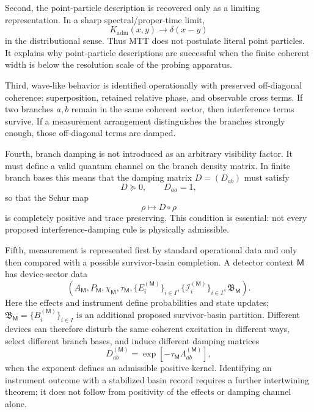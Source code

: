 \documentclass[11pt]{article}
\newcommand{\Kadm}{K_{\mathrm{adm}}}
\newcommand{\Meas}{\mathsf M}
\begin{document}
Second, the point-particle description is recovered only as a limiting representation. In a
sharp spectral/proper-time limit,
\begin{equation}
  \Kadm(x,y)\longrightarrow \delta(x-y)
\end{equation}
in the distributional sense. Thus MTT does not postulate literal point particles. It explains
why point-particle descriptions are successful when the finite coherent width is below the
resolution scale of the probing apparatus.

Third, wave-like behavior is identified operationally with preserved off-diagonal coherence:
superposition, retained relative phase, and observable cross terms. If two branches \(a,b\)
remain in the same coherent sector, then interference terms survive. If a measurement
arrangement distinguishes the branches strongly enough, those off-diagonal terms are damped.

Fourth, branch damping is not introduced as an arbitrary visibility factor. It must define a
valid quantum channel on the branch density matrix. In finite branch bases this means that
the damping matrix \(D=(D_{ab})\) must satisfy
\begin{equation}
  D\succeq0,
  \qquad
  D_{aa}=1,
\end{equation}
so that the Schur map
\begin{equation}
  \rho\mapsto D\circ\rho
\end{equation}
is completely positive and trace preserving. This condition is essential: not every proposed
interference-damping rule is physically admissible.

Fifth, measurement is represented first by standard operational data and only then compared
with a possible survivor-basin completion. A detector context \(\Meas\) has device-sector data
\begin{equation}
  (A_{\Meas},P_{\Meas},\chi_{\Meas},\tau_{\Meas},
  \{E_i^{(\Meas)}\}_{i\in I},
  \{\mathcal I_i^{(\Meas)}\}_{i\in I},
  \mathfrak B_{\Meas}).
\end{equation}
Here the effects and instrument define probabilities and state updates;
\(\mathfrak B_{\Meas}=\{B_i^{(\Meas)}\}_{i\in I}\) is an additional proposed survivor-basin partition.
Different devices can therefore disturb the same coherent excitation in different ways, select
different branch bases, and induce different damping matrices
\begin{equation}
  D_{ab}^{(\Meas)}
  =
  \exp[-\tau_{\Meas}\Lambda_{ab}^{(\Meas)}],
\end{equation}
when the exponent defines an admissible positive kernel. Identifying an instrument outcome
with a stabilized basin record requires a further intertwining theorem; it does not follow
from positivity of the effects or damping channel alone.
\end{document}
